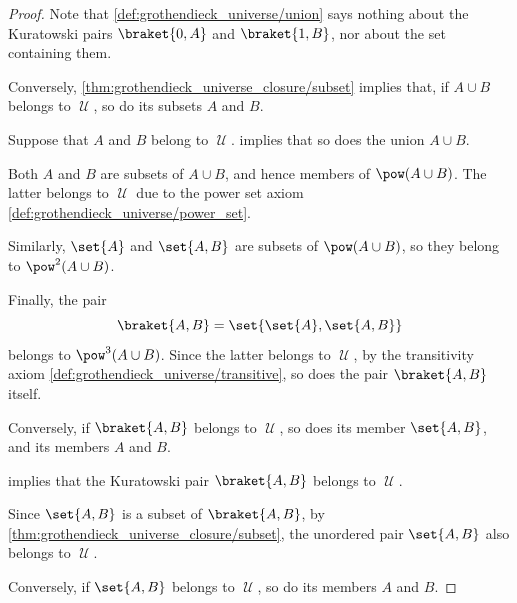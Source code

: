 \begin{proof}
  Note that \ref{def:grothendieck_universe/union} says nothing about the Kuratowski pairs \( \braket{ 0, A } \) and \( \braket{ 1, B } \), nor about the set containing them.

  \NecessitySubProof* Conversely, \cref{thm:grothendieck_universe_closure/subset} implies that, if \( A \cup B \) belongs to \( \mscrU \), so do its subsets \( A \) and \( B \).


  \SufficiencySubProof* Suppose that \( A \) and \( B \) belong to \( \mscrU \).  implies that so does the union \( A \cup B \).

  Both \( A \) and \( B \) are subsets of \( A \cup B \), and hence members of \( \pow(A \cup B) \). The latter belongs to \( \mscrU \) due to the power set axiom \ref{def:grothendieck_universe/power_set}.

  Similarly, \( \set{ A } \) and \( \set{ A, B } \) are subsets of \( \pow(A \cup B) \), so they belong to \( \pow^2(A \cup B) \).

  Finally, the pair
  \begin{equation*}
    \braket{ A, B } = \set{ \set{ A }, \set{ A, B } }
  \end{equation*}
  belongs to \( \pow^3(A \cup B) \). Since the latter belongs to \( \mscrU \), by the transitivity axiom \ref{def:grothendieck_universe/transitive}, so does the pair \( \braket{ A, B } \) itself.

  \NecessitySubProof* Conversely, if \( \braket{ A, B } \) belongs to \( \mscrU \), so does its member \( \set{ A, B } \), and its members \( A \) and \( B \).


  \SufficiencySubProof* {} implies that the Kuratowski pair \( \braket{ A, B } \) belongs to \( \mscrU \).

  Since \( \set{ A, B } \) is a subset of \( \braket{ A, B } \), by \cref{thm:grothendieck_universe_closure/subset}, the unordered pair \( \set{ A, B } \) also belongs to \( \mscrU \).

  \NecessitySubProof* Conversely, if \( \set{ A, B } \) belongs to \( \mscrU \), so do its members \( A \) and \( B \).



\end{proof}
